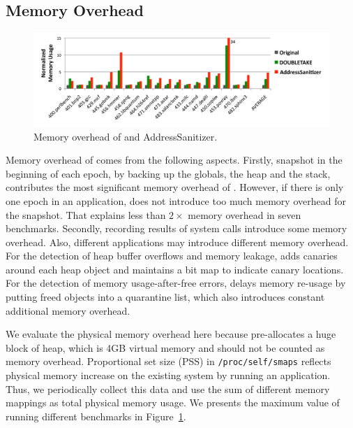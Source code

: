 \label{sec:memoverhead}


\subsection{Memory Overhead}
\begin{figure}
\begin{center}
\includegraphics[width=6.5in]{figure/memory}
\end{center}
\caption{
Memory overhead of \doubletake{} and AddressSanitizer.
\label{fig:memory}}
\end{figure}

\label{sec:memoverhead}
Memory overhead of \doubletake{} comes from the following aspects. Firstly, snapshot in the beginning of each epoch, by backing up the globals, the heap and the stack, contributes the most significant memory overhead of \doubletake{}. However, if there is only one epoch in an application, \doubletake{} does not introduce too much memory overhead for the snapshot. That explains less than $2\times$ memory overhead in seven benchmarks. Secondly, recording results of system calls introduce some memory overhead. Also, different applications may introduce different memory overhead. For the detection of heap buffer overflows and memory leakage, \doubletake{} adds canaries around each heap object and maintains a bit map to indicate canary locations. For the detection of memory usage-after-free errors, \doubletake{} delays memory re-usage by putting freed objects into a quarantine list, which also introduces constant additional memory overhead. 

We evaluate the physical memory overhead here because \doubletake{} pre-allocates a huge block of heap, which is 4GB virtual memory and should not be counted as memory overhead. Proportional set size (PSS) in \texttt{/proc/self/smaps} reflects physical memory increase on the existing system by running an application. Thus, we periodically collect this data and use the sum of different memory mappings as total physical memory usage. We presents the maximum value of  running different benchmarks in Figure~\ref{fig:memory}. 

